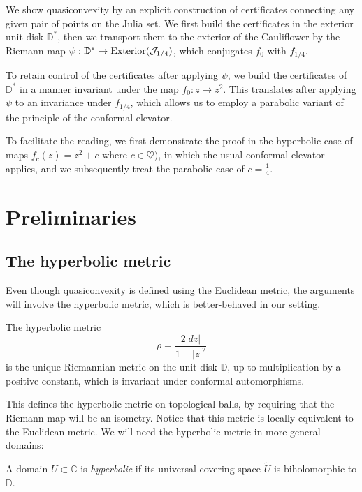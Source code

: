 We show quasiconvexity by an explicit construction of certificates connecting any given pair of points on the Julia set.
We first build the certificates in the exterior unit disk $\mathbb D ^*$, 
then we transport them to the exterior of the Cauliflower by the Riemann map $\psi: \mathbb D ^* \to \operatorname{Exterior}(\mathcal J_{1 / 4})$, 
which conjugates $f_0$ with $f_{1/4}$.

To retain control of the certificates after applying $\psi$, 
we build the certificates of $\mathbb D^*$ in a manner invariant under the map $f_0: z\mapsto z^2$.
This translates after applying $\psi$ to an invariance under $f_{1/4}$,
which allows us to employ a parabolic variant of the principle of the conformal elevator.

To facilitate the reading, we first demonstrate the proof in the hyperbolic case of maps $f_c(z)=z^2+c$ where 
$c\in \heartsuit)$, in which the usual conformal elevator applies, 
and we subsequently treat the parabolic case of $c=\frac{1}{4}$.

\section{Preliminaries}

\subsection{The hyperbolic metric}
Even though quasiconvexity is defined using the Euclidean metric, 
the arguments will involve the hyperbolic metric, which is better-behaved in our setting.

\begin{theorem}
	The hyperbolic metric
	\begin{equation} \label{thm: hyp-metric-in-disk}
		\rho = \frac {2|dz|}{1-|z|^2}
	\end{equation}
	is the unique Riemannian metric on the unit disk $\mathbb D$, up to multiplication
	by a positive constant, which is invariant under conformal automorphisms.
\end{theorem}

This defines the hyperbolic metric on topological balls, by requiring that the Riemann map
will be an isometry. Notice that this metric is locally equivalent to the Euclidean metric.
We will need the hyperbolic metric in more general domains:

\begin{definition}
	A domain $U \subset \mathbb C$ is \emph{hyperbolic} if its 
	universal covering space $\tilde U$ is biholomorphic to $\mathbb D$.
\end{definition}

